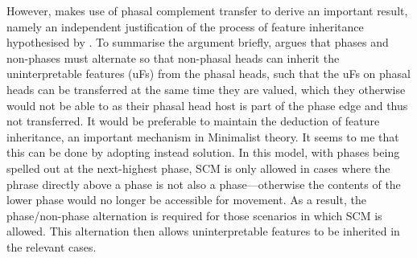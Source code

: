 However, \textcite{RichardsMD_2007} makes use of phasal complement transfer to derive an important result, namely an independent justification of the process of feature inheritance hypothesised by \textcite{ChomskyN_2008}. To summarise the argument briefly, \textcite{RichardsMD_2007} argues that phases and non-phases must alternate so that non-phasal heads can inherit the uninterpretable features (uFs) from the phasal heads, such that the uFs on phasal heads can be transferred at the same time they are valued, which they otherwise would not be able to as their phasal head host is part of the phase edge and thus not transferred. It would be preferable to maintain the deduction of feature inheritance, an important mechanism in Minimalist theory. It seems to me that this can be done by adopting instead  solution. In this model, with phases being spelled out at the next-highest phase, SCM is only allowed in cases where the phrase directly above a phase is not also a phase---otherwise the contents of the lower phase would no longer be accessible for movement. As a result, the phase/non-phase alternation is required for those scenarios in which SCM is allowed. This alternation then allows uninterpretable features to be inherited in the relevant cases.



